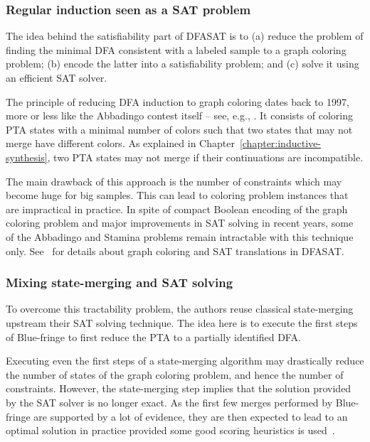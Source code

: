 \subsubsection*{Regular induction seen as a SAT problem}

The idea behind the satisfiability part of DFASAT is to (a) reduce the problem of finding the minimal DFA consistent with a labeled sample to a graph coloring problem; (b) encode the latter into a satisfiability problem; and (c) solve it using an efficient SAT solver. 

The principle of reducing DFA induction to graph coloring dates back to 1997, more or less like the Abbadingo contest itself -- see, e.g., \cite{Coste:1997}. It consists of coloring PTA states with a minimal number of colors such that two states that may not merge have different colors. As explained in Chapter~\ref{chapter:inductive-synthesis}, two PTA states may not merge if their continuations are incompatible.

The main drawback of this approach is the number of constraints which may become huge for big samples. This can lead to coloring problem instances that are impractical in practice. In spite of compact Boolean encoding of the graph coloring problem and major improvements in SAT solving in recent years, some of the Abbadingo and Stamina problems remain intractable with this technique only. See~\cite{Heule:2010} for details about graph coloring and SAT translations in DFASAT.

\subsubsection*{Mixing state-merging and SAT solving}

To overcome this tractability problem, the authors reuse classical state-merging upstream their SAT solving technique. The idea here is to execute the first steps of Blue-fringe to first reduce the PTA to a partially identified DFA. 

Executing even the first steps of a state-merging algorithm may drastically reduce the number of states of the graph coloring problem, and hence the number of constraints. However, the state-merging step implies that the solution provided by the SAT solver is no longer exact. As the first few merges performed by Blue-fringe are supported by a lot of evidence, they are then expected to lead to an optimal solution in practice provided some good scoring heuristics is used~\cite{Heule:2010}. 

